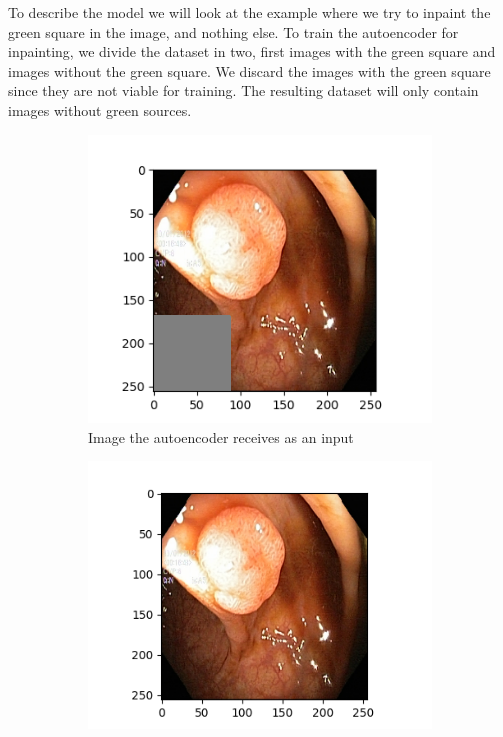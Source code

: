\vspace{5px}

To describe the model we will look at the example where we try to inpaint the green square in the image, and nothing else.
To train the autoencoder for inpainting, we divide the dataset in two, first images with the green square and images without the green square. We discard the images with the green square since they are not viable for training.  The resulting dataset will only contain images without green sources. 

\begin{figure}[]
\centering
\begin{subfigure}[b]{0.45\textwidth}
    \centering
    \includegraphics[width=\textwidth]{methodology/figures/masked_img.png}
    \caption{Image the autoencoder receives as an input }    
    \label{fig:AErec}
\end{subfigure}
\hfill
\begin{subfigure}[b]{0.49\textwidth}  
    \centering 
    \includegraphics[width=\textwidth]{methodology/figures/whole_img.png}

\end{subfigure}
\end{figure}
